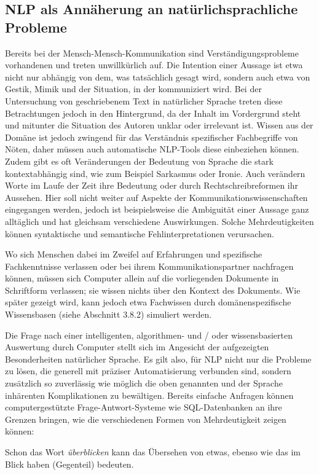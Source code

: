 \documentclass[12pt]{report}
\begin{document}
\subsection{NLP als Annäherung an natürlichsprachliche Probleme}
Bereits bei der Mensch-Mensch-Kommunikation sind  Verständigungsprobleme vorhandenen und treten unwillkürlich auf. Die Intention einer Aussage ist etwa nicht nur abhängig von dem, was tatsächlich gesagt wird, sondern auch etwa von Gestik, Mimik und der Situation, in der kommuniziert wird. Bei der Untersuchung von geschriebenem Text in natürlicher Sprache treten diese Betrachtungen jedoch in den Hintergrund, da der Inhalt im Vordergrund steht und mitunter die Situation des Autoren unklar oder irrelevant ist. Wissen aus der Domäne ist jedoch zwingend für das Verständnis spezifischer Fachbegriffe von Nöten, daher müssen auch automatische NLP-Tools diese einbeziehen können. Zudem gibt es oft Veränderungen der Bedeutung von Sprache die stark kontextabhängig sind, wie zum Beispiel Sarkasmus oder Ironie. Auch verändern Worte im Laufe der Zeit ihre Bedeutung oder durch Rechtschreibreformen ihr Aussehen. Hier soll nicht weiter auf Aspekte der Kommunikationswissenschaften eingegangen werden, jedoch ist beispielsweise die Ambiguität einer Aussage ganz alltäglich und hat gleichsam verschiedene Auswirkungen. Solche Mehrdeutigkeiten können syntaktische und semantische Fehlinterpretationen verursachen. \cite{wei89}

Wo sich Menschen dabei im Zweifel auf Erfahrungen und spezifische Fachkenntnisse verlassen oder bei ihrem Kommunikationspartner nachfragen können, müssen sich Computer allein auf die vorliegenden Dokumente in Schriftform verlassen; sie wissen nichts über den Kontext des Dokuments. Wie später gezeigt wird, kann jedoch etwa Fachwissen durch domänenspezifische Wissensbasen (siehe Abschnitt 3.8.2) simuliert werden. 

Die Frage nach einer intelligenten, algorithmen- und / oder wissensbasierten Auswertung durch Computer stellt sich im Angesicht der aufgezeigten Besonderheiten natürlicher Sprache. Es gilt also, für NLP nicht nur die Probleme zu lösen, die generell mit präziser Automatisierung verbunden sind, sondern zusätzlich so zuverlässig wie möglich die oben genannten und der Sprache inhärenten Komplikationen zu bewältigen. 
Bereits einfache Anfragen können computergestützte Frage-Antwort-Systeme wie SQL-Datenbanken an ihre Grenzen bringen, wie die verschiedenen Formen von Mehrdeutigkeit zeigen können:

Schon das Wort \textit{überblicken} kann das Übersehen von etwas, ebenso wie das im Blick haben (Gegenteil) bedeuten.
\end{document}
